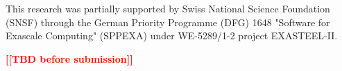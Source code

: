 \documentclass[]{usiinfthesis}
\newcommand{\todop}[1]{\noindent\textbf{\textcolor{red}{[[#1]]}}\\}
\begin{document}
\begin{acknowledgements}
This research was partially supported by Swiss National Science Foundation (SNSF) through  the German Priority Programme (DFG) 1648 "Software for Exascale Computing" (SPPEXA) under WE-5289/1-2 project EXASTEEL-II.

\todop{TBD before submission} 
\end{acknowledgements}

\tableofcontents 

\mainmatter







\appendix %



\backmatter


%

%
%
%
%


\cleardoublepage
\end{document}

